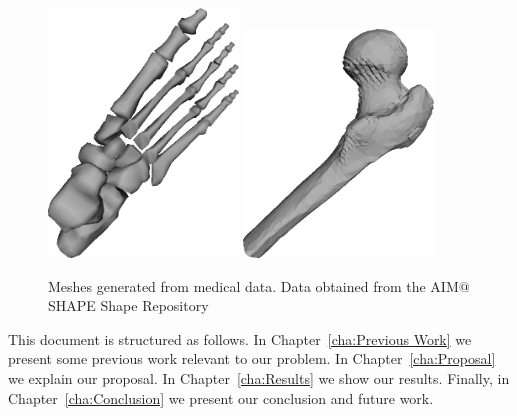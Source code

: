 \begin{figure}
\centering
\includegraphics[width=0.45\textwidth]{pictures/image01.png}
\includegraphics[width=0.45\textwidth]{pictures/image02.png}
\caption{Meshes generated from medical data. Data obtained from the AIM$@$SHAPE Shape Repository \cite{AIMSHAPE}}
\label{fig:example}
\end{figure}


This document is structured as follows. In Chapter~\ref{cha:Previous Work} we present some previous work relevant to our problem. In Chapter~\ref{cha:Proposal} we explain our proposal. In Chapter~\ref{cha:Results} we show our results. Finally, in Chapter~\ref{cha:Conclusion} we present our conclusion and future work.


